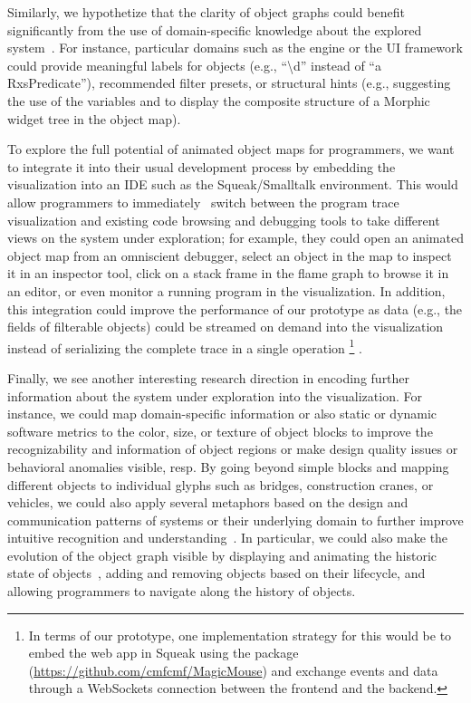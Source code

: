 Similarly, we hypothetize that the clarity of object graphs could benefit significantly from the use of domain-specific knowledge about the explored system~\cite{chis2014moldable}.
For instance, particular domains such as the  engine or the  UI framework could provide meaningful labels for objects (e.g., ``\textbackslash{}d'' instead of ``a RxsPredicate''), recommended filter presets, or structural hints (e.g., suggesting the use of the variables  and  to display the composite structure of a Morphic widget tree in the object map).

To explore the full potential of animated object maps for programmers, we want to integrate it into their usual development process by embedding the visualization into an IDE such as the Squeak/Smalltalk environment.
This would allow programmers to immediately~\cite{ungar1997debugging} switch between the program trace visualization and existing code browsing and debugging tools to take different views on the system under exploration; for example, they could open an animated object map from an omniscient debugger, select an object in the map to inspect it in an inspector tool, click on a stack frame in the flame graph to browse it in an editor, or even monitor a running program in the visualization.
In addition, this integration could improve the performance of our prototype as data (e.g., the fields of filterable objects) could be streamed on demand into the visualization instead of serializing the complete trace in a single operation%
\footnote{In terms of our \tfd{} prototype, one implementation strategy for this would be to embed the web app in Squeak using the  package (\url{https://github.com/cmfcmf/MagicMouse}) and exchange events and data through a WebSockets connection between the frontend and the backend.}%
.

Finally, we see another interesting research direction in encoding further information about the system under exploration into the visualization.
For instance, we could map domain-specific information or also static or dynamic software metrics to the color, size, or texture of object blocks to improve the recognizability and information of object regions or make design quality issues or behavioral anomalies visible, resp.
By going beyond simple blocks and mapping different objects to individual glyphs such as bridges, construction cranes, or vehicles, we could also apply several metaphors based on the design and communication patterns of systems or their underlying domain to further improve intuitive recognition and understanding~\cite{cheng2008xdiva,wurfel2015natural}.
In particular, we could also make the evolution of the object graph visible by displaying and animating the historic state of objects~\cite{thiede2023object,thiede2023time}, adding and removing objects based on their lifecycle, and allowing programmers to navigate along the history of objects.
